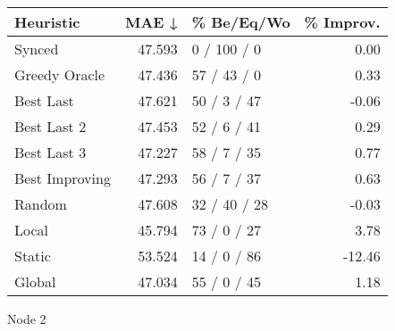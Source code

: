 \begin{tabular}{lrlr}
\toprule
\textbf{Heuristic} & \textbf{MAE ↓} & \textbf{\% Be/Eq/Wo} & \textbf{\% Improv.} \\
\midrule
            Synced &         47.593 &          0 / 100 / 0 &                0.00 \\
     Greedy Oracle &         47.436 &          57 / 43 / 0 &                0.33 \\
         Best Last &         47.621 &          50 / 3 / 47 &               -0.06 \\
       Best Last 2 &         47.453 &          52 / 6 / 41 &                0.29 \\
       Best Last 3 &         47.227 &          58 / 7 / 35 &                0.77 \\
    Best Improving &         47.293 &          56 / 7 / 37 &                0.63 \\
            Random &         47.608 &         32 / 40 / 28 &               -0.03 \\
             Local &         45.794 &          73 / 0 / 27 &                3.78 \\
            Static &         53.524 &          14 / 0 / 86 &              -12.46 \\
            Global &         47.034 &          55 / 0 / 45 &                1.18 \\
\bottomrule
\end{tabular}
\caption{Node 2}
\label{tab:non_lr01_le1_bs4_2}
